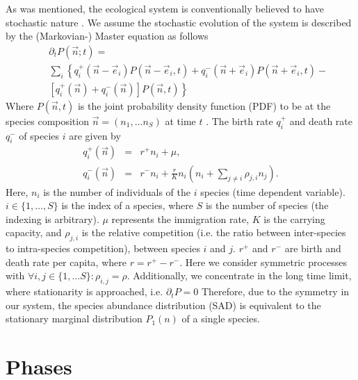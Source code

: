 \documentclass[%
 amsmath,amssymb,
 reprint,%
]{revtex4-2}
\begin{document}
As was mentioned, the ecological system is conventionally believed to have stochastic nature \cite{black2012stochastic}. We assume the stochastic evolution of the system is described by the (Markovian-) Master equation as follows
\begin{eqnarray}
&& \partial_t  
P(\vec{n};t)=
\\ \nonumber
&&\sum_{i}\left\{q^+_i (\vec{n}-\vec{e}_i)P(\vec{n}-\vec{e}_i,t)+ \right.
q^-_i (\vec{n}+\vec{e}_i)P(\vec{n}+\vec{e}_i,t)- \\
&& \left. \left[q^+_i(\vec{n})+q^-_i(\vec{n})\right]P(\vec{n},t)
\right\}    \nonumber
\end{eqnarray}
Where $P(\vec{n},t)$ is the joint probability density function (PDF) to be at the species composition $\vec{n}=(n_1,\dots n_S)$ at time $t$ \cite{gardiner1985handbook}. The birth rate $q^+_i$ and death rate $q^-_i$ of species $i$ are given by 
\begin{eqnarray}
q_i^+(\vec{n})&=&r^+ n_i +\mu,  \\
q_i^-(\vec{n})&=&r^- n_i + \frac{r}{K} n_i \left(n_i +\sum_{j\neq i} \rho _{j,i} n_j\right). \nonumber
\end{eqnarray}
Here, $n_i$ is the number of individuals of the $i$ species (time dependent variable). $i\in \{1,\dots,S\}$ is the index of a species, where $S$ is the number of species (the indexing is arbitrary). $\mu$ represents the immigration rate, $K$ is the carrying capacity, and $\rho_{j,i}$ is the relative competition (i.e. the ratio between inter-species to intra-species competition), between species $i$ and $j$. $r^+$ and $r^-$ are birth and death rate per capita, where $r=r^+-r^-$.   
Here we consider symmetric processes with  $\forall i,j\in \{1,\dots S\}:\rho_{i,j}=\rho$. Additionally, we concentrate in the long time limit, where stationarity is approached, i.e. $\partial_t P=0$
Therefore, due to the symmetry in our system, the species abundance distribution (SAD) is equivalent to the stationary marginal distribution $P_1(n)$ of a single species. 

\section{Phases} 
\end{document}
